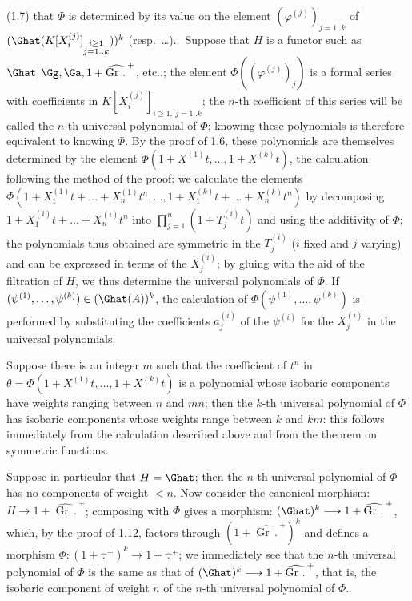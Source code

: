 %
(1.7) that \(\Phi\) is determined by its value on the element \((\varphi^{(j)})_{j=1..k}\) of \((\Ghat(K[X_i^{(j)}]_{\substack{i\geq1\\ j=1..k}}))^k\) (resp.\ \ldots)..\ Suppose that \(H\) is a functor such as \(\Ghat,\Gg,\Ga,1+\widehat{\operatorname{Gr}\,\mathord{.}\,}^{+}\), etc..; the element \(\Phi((\varphi^{(j)})_{j})\) is a formal series with coefficients in \(K[X_i^{(j)}]_{i\geq1,\ j=1..k}\); the \(n\)-th coefficient of this series will be called the \uline{\(n\)-th universal polynomial of} \(\Phi\); knowing these polynomials is therefore equivalent to knowing \(\Phi\). By the proof of 1.6, these polynomials are themselves determined by the element \(\Phi(1+X^{(1)}t,\ldots,1+X^{(k)}t)\), the calculation following the method of the proof: we calculate the elements \(\Phi(1+X_1^{(1)}t+\ldots+X_n^{(1)}t^n,\ldots,1+X_1^{(k)}t+\ldots+X_n^{(k)}t^n)\) by decomposing \(1+X_1^{(i)}t+\ldots+X_n^{(i)}t^n\) into \(\prod_{j=1}^{n}(1+T_j^{(i)}t)\) and using the additivity of \(\Phi\); the polynomials thus obtained are symmetric in the \(T_j^{(i)}\) (\(i\) fixed and \(j\) varying) and can be expressed in terms of the \(X_j^{(i)}\); by gluing with the aid of the filtration of \(H\), we thus determine the universal polynomials of \(\Phi\). If \((\psi^{(1)},\ldots,\psi^{(k)})\in(\Ghat(A))^k\), the calculation of \(\Phi(\psi^{(1)},\ldots,\psi^{(k)})\) is performed by substituting the coefficients \(a_j^{(i)}\) of the \(\psi^{(i)}\) for the \(X_j^{(i)}\) in the universal polynomials.

Suppose there is an integer \(m\) such that the coefficient of \(t^n\) in \(\theta=\Phi(1+X^{(1)}t,\ldots,1+X^{(k)}t)\) is a polynomial whose isobaric components have weights ranging between \(n\) and \(mn\); then the \(k\)-th universal polynomial of \(\Phi\) has isobaric components whose weights range between \(k\) and \(km\): this follows immediately from the calculation described above and from the theorem on symmetric functions.

%
Suppose in particular that \(H=\Ghat\); then the \(n\)-th universal polynomial of \(\Phi\) has no components of weight \(<n\). Now consider the canonical morphism: \(H\longrightarrow1+\widehat{\operatorname{Gr}\,\mathord{.}\,}^{+}\); composing with \(\Phi\) gives a morphism: \((\Ghat)^k\longrightarrow1+\widehat{\operatorname{Gr}\,\mathord{.}\,}^{+}\), which, by the proof of 1.12, factors through \((1+\widehat{\operatorname{Gr}\,\mathord{.}\,}^{+})^k\) and defines a morphism \(\Phi:(1+\widehat{\,\mathord{.}\,}^{+})^k\longrightarrow1+\widehat{\,\mathord{.}\,}^{+}\); we immediately see that the \(n\)-th universal polynomial of \(\Phi\) is the same as that of \((\Ghat)^k\longrightarrow1+\widehat{\operatorname{Gr}\,\mathord{.}\,}^{+}\), that is, the isobaric component of weight \(n\) of the \(n\)-th universal polynomial of \(\Phi\).

